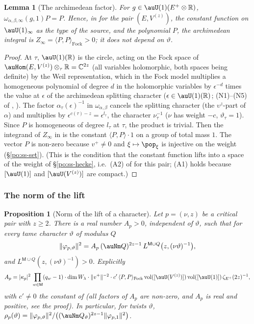 \documentclass[10pt]{amsart}
\newtheorem{proposition}[theorem]{Proposition}
\newtheorem{lemma}[theorem]{Lemma}
\theoremstyle{definition}
\theoremstyle{remark}
\newcommand{\C}{\mathbb C}
\newcommand{\R}{\mathbb R}
\begin{document}
\begin{lemma}[The archimedean factor]\label{pex:arch}
For $g\in\auU(1)(E^+\otimes\R)$, $\omega_{\alpha,\beta,\infty}(g,1)P=P$. Hence, in
{\cite[Proposition~2.16]{P53}} for the pair $(E,V^{(z)})$, the constant function on $\auU(1)_\infty$ as
the type of the source, and the polynomial $P$, the archimedean integral is
$Z_\infty=\langle P,P\rangle_{\mathrm{Fock}}>0$; it does not depend on $\vartheta$.
\end{lemma}
\begin{proof}
At $\tau$, $\auU(1)(\R)$ is the circle, acting on the Fock space of $\auHom(E,V^{(z)})\otimes_\tau\R=
\C^{2z}$ (all variables holomorphic, both spaces being definite) by the Weil representation, which in
the Fock model multiplies a homogeneous polynomial of degree $d$ in the holomorphic variables by
$\epsilon^{-d}$ times the value at $\epsilon$ of the archimedean splitting character
($\epsilon\in\auU(1)(\R)$; (N1)--(N5) of {\cite[\S6.1]{P49}}, \cite{KashiwaraVergne}). The factor
$\alpha_\tau(\epsilon)^{-1}$ in $\omega_{\alpha,\beta}$ cancels the splitting character (the
$\upsilon^z$-part of $\alpha$) and multiplies by $\epsilon^{c(\tau)-z}=\epsilon^{l_\tau}$, the
character $\nu_\tau^{-1}$ ($\nu$ has weight $-c$, $\vartheta_\tau=1$). Since $P$ is homogeneous of
degree $l_\tau$ at $\tau$, the product is trivial. Then the integrand of $Z_\infty$ in
{\cite[Lemma~2.10(A3)]{P53}} is the constant $\langle P,P\rangle\cdot1$ on a group of total mass $1$. The
vector $P$ is non-zero because $v^+\ne0$ and $\xi\mapsto\pop_\xi$ is injective on the weight
(\S\ref{po:ss-set}). (This is the condition that the constant function lifts into a space of the
weight of \S\ref{po:ss-hecke}, i.e.\ (A2) of {\cite[Lemma~2.10]{P53}} for this pair; (A1) holds because
$[\auU(1)]$ and $[\auU(V^{(z)})]$ are compact.)
\end{proof}

\subsubsection{The norm of the lift}\label{pex:ss-rallis}

\begin{proposition}[Norm of the lift of a character]\label{pex:rallis}
Let $p=(\nu,z)$ be a critical pair with $z\ge2$. There is a real number $A_p>0$, independent of
$\vartheta$, such that for every tame character $\vartheta$ of modulus $Q$
\[
\|\varphi_{p,\vartheta}\|^2=A_p\,(\auNm Q)^{2z-1}\,L^{\mathsf M\cup Q}\bigl(z,(\nu\vartheta)^{-1}\bigr),
\]
and $L^{\mathsf M\cup Q}(z,(\nu\vartheta)^{-1})>0$. Explicitly
\[
A_p=|\kappa_p|^2\,\prod_{w\in\mathsf M}(q_w-1)\cdot\dim W_{\lambda}\cdot\|v^+\|^{-2}\cdot c'\,
\langle P,P\rangle_{\mathrm{Fock}}\,\mathrm{vol}([\auU(V^{(z)})])\,\mathrm{vol}([\auU(1)])\,
\zeta_{E^+}(2z)^{-1},
\]
with $c'\ne0$ the constant of {\cite[Lemma~2.14(b)]{P53}} (all factors of $A_p$ are non-zero, and $A_p$ is real and positive, see the proof). In particular, for twists $\vartheta$, $\rho_p(\vartheta)=\|\varphi_{p,\vartheta}\|^2/
\bigl((\auNm Q_\vartheta)^{2z-1}\|\varphi_{p,1}\|^2\bigr)$.
\end{proposition}
\end{document}
